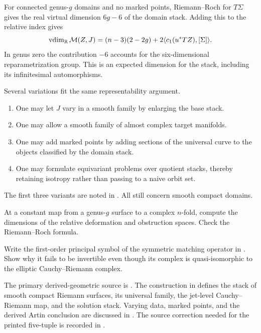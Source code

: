 For connected genus-$g$ domains and no marked points, Riemann--Roch for
$T\Sigma$ gives the real virtual dimension $6g-6$ of the domain stack.
Adding this to the relative index gives
\[
 \operatorname{vdim}_{\mathbb{R}}\mathcal M(Z,J)
 =(n-3)(2-2g)+2\langle c_1(u^*TZ),[\Sigma]\rangle.
\]
In genus zero the contribution $-6$ accounts for the six-dimensional
reparametrization group. This is an expected dimension for the stack,
including its infinitesimal automorphisms.

Several variations fit the same representability argument.
\begin{enumerate}
  \item One may let $J$ vary in a smooth family by enlarging the base stack.
  \item One may allow a smooth family of almost complex target manifolds.
  \item One may add marked points by adding sections of the universal curve to
    the objects classified by the domain stack.
  \item One may formulate equivariant problems over quotient stacks, thereby
    retaining isotropy rather than passing to a naive orbit set.
\end{enumerate}
The first three variants are noted in
\cite[Remark~4.0.2]{Steffens_Representability_Elliptic_Moduli}. All still
concern smooth compact domains.

\begin{exercise}
At a constant map from a genus-$g$ surface to a complex $n$-fold, compute
the dimensions of the relative deformation and obstruction spaces.
Check the Riemann--Roch formula.
\end{exercise}

\begin{exercise}
Write the first-order principal symbol of the symmetric matching operator
in .
Show why it fails to be invertible even though its complex is
quasi-isomorphic to the elliptic Cauchy--Riemann complex.
\end{exercise}

The primary derived-geometric source is
\citet{Steffens_Representability_Elliptic_Moduli}.
The construction in
\cite[Construction~4.0.1]{Steffens_Representability_Elliptic_Moduli}
defines the stack of smooth compact
Riemann surfaces, its universal family, the jet-level Cauchy--Riemann map, and
the solution stack. Varying data, marked points, and the derived Artin
conclusion are discussed in
\cite[Remarks~4.0.2--4.0.3]{Steffens_Representability_Elliptic_Moduli}.
The source correction needed for the printed five-tuple is recorded in
.

